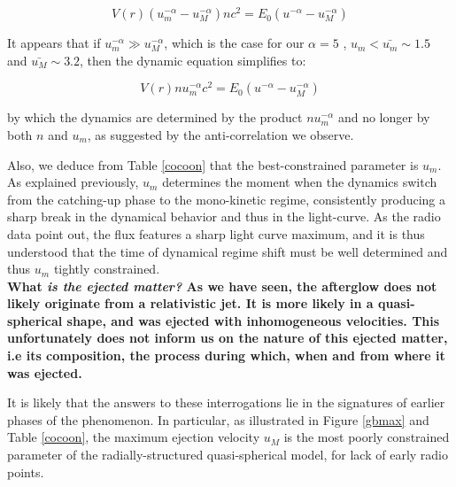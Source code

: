 \begin{equation}V(r)(u_m^{-\alpha} - u_M^{-\alpha}) n c ^ 2= E_0 (u^{-\alpha} - u_M^{-\alpha}) \end{equation}

It appears that if $u_m^{-\alpha} \gg u_M^{-\alpha}$, which is the case for our $\alpha = 5$ , $u_m < \bar{u_m} \sim 1.5$ and $\bar{u_M} \sim 3.2$, then the dynamic equation simplifies to:

\begin{equation}V(r) n u_m^{-\alpha} c^2 = E_0 (u^{-\alpha} - u_M^{-\alpha}) \end{equation}

by which the dynamics are determined by the product $n u_m^{-\alpha}$ and no longer by both $n$ and $u_m$, as suggested by the anti-correlation we observe.

Also, we deduce from Table \ref{cocoon} that the best-constrained parameter is $u_m$. As explained previously, $u_m$ determines the moment when the dynamics switch from the catching-up phase to the mono-kinetic regime, consistently producing a sharp break in the dynamical behavior and thus in the light-curve. As the radio data point out, the flux features a sharp light curve maximum, and it is thus understood that the time of dynamical regime shift must be well determined and thus $u_m$ tightly constrained.\\

\bf{What \it{is} the ejected matter? }As we have seen, the afterglow does not likely originate from a relativistic jet. It is more likely in a quasi-spherical shape, and was ejected with inhomogeneous velocities. This unfortunately does not inform us on the nature of this ejected matter, i.e its composition, the process during which, when and from where it was ejected.

It is likely that the answers to these interrogations lie in the signatures of earlier phases of the phenomenon. In particular, as illustrated in Figure \ref{gbmax} and Table \ref{cocoon}, the maximum ejection velocity $u_M$ is the most poorly constrained parameter of the radially-structured quasi-spherical model, for lack of early radio points.


